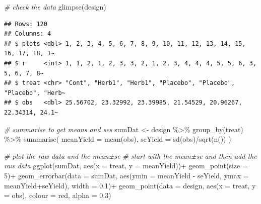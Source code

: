 \documentclass[
]{book}
\newenvironment{Shaded}{\begin{snugshade}}{\end{snugshade}}
\newcommand{\AttributeTok}[1]{\textcolor[rgb]{0.77,0.63,0.00}{#1}}
\newcommand{\CommentTok}[1]{\textcolor[rgb]{0.56,0.35,0.01}{\textit{#1}}}
\newcommand{\DecValTok}[1]{\textcolor[rgb]{0.00,0.00,0.81}{#1}}
\newcommand{\FloatTok}[1]{\textcolor[rgb]{0.00,0.00,0.81}{#1}}
\newcommand{\FunctionTok}[1]{\textcolor[rgb]{0.00,0.00,0.00}{#1}}
\newcommand{\NormalTok}[1]{#1}
\newcommand{\OtherTok}[1]{\textcolor[rgb]{0.56,0.35,0.01}{#1}}
\newcommand{\SpecialCharTok}[1]{\textcolor[rgb]{0.00,0.00,0.00}{#1}}
\newcommand{\StringTok}[1]{\textcolor[rgb]{0.31,0.60,0.02}{#1}}
\begin{document}
\begin{Shaded}
\begin{Highlighting}[]
\CommentTok{\# check the data}
\FunctionTok{glimpse}\NormalTok{(design)}
\end{Highlighting}
\end{Shaded}

\begin{verbatim}
## Rows: 120
## Columns: 4
## $ plots <dbl> 1, 2, 3, 4, 5, 6, 7, 8, 9, 10, 11, 12, 13, 14, 15, 16, 17, 18, 1~
## $ r     <int> 1, 1, 2, 1, 2, 3, 3, 2, 1, 2, 3, 4, 4, 4, 5, 5, 6, 3, 5, 6, 7, 8~
## $ treat <chr> "Cont", "Herb1", "Herb1", "Placebo", "Placebo", "Placebo", "Herb~
## $ obs   <dbl> 25.56702, 23.32992, 23.39985, 21.54529, 20.96267, 22.34314, 24.1~
\end{verbatim}

\begin{Shaded}
\begin{Highlighting}[]
\CommentTok{\# summarise to get means and ses}
\NormalTok{sumDat }\OtherTok{\textless{}{-}}\NormalTok{ design }\SpecialCharTok{\%\textgreater{}\%} 
  \FunctionTok{group\_by}\NormalTok{(treat) }\SpecialCharTok{\%\textgreater{}\%} 
  \FunctionTok{summarise}\NormalTok{(}
    \AttributeTok{meanYield =} \FunctionTok{mean}\NormalTok{(obs),}
    \AttributeTok{seYield =} \FunctionTok{sd}\NormalTok{(obs)}\SpecialCharTok{/}\FunctionTok{sqrt}\NormalTok{(}\FunctionTok{n}\NormalTok{())}
\NormalTok{  )}

\CommentTok{\# plot the raw data and the mean±se}
\CommentTok{\# start with the mean±se and then add the raw data}
\FunctionTok{ggplot}\NormalTok{(sumDat, }\FunctionTok{aes}\NormalTok{(}\AttributeTok{x =}\NormalTok{ treat, }\AttributeTok{y =}\NormalTok{ meanYield))}\SpecialCharTok{+}
  \FunctionTok{geom\_point}\NormalTok{(}\AttributeTok{size =} \DecValTok{5}\NormalTok{)}\SpecialCharTok{+}
  \FunctionTok{geom\_errorbar}\NormalTok{(}\AttributeTok{data =}\NormalTok{ sumDat, }\FunctionTok{aes}\NormalTok{(}\AttributeTok{ymin =}\NormalTok{ meanYield }\SpecialCharTok{{-}}\NormalTok{ seYield, }\AttributeTok{ymax =}\NormalTok{ meanYield}\SpecialCharTok{+}\NormalTok{seYield),}
                \AttributeTok{width =} \FloatTok{0.1}\NormalTok{)}\SpecialCharTok{+}
  \FunctionTok{geom\_point}\NormalTok{(}\AttributeTok{data =}\NormalTok{ design, }\FunctionTok{aes}\NormalTok{(}\AttributeTok{x =}\NormalTok{ treat, }\AttributeTok{y =}\NormalTok{ obs), }\AttributeTok{colour =} \StringTok{\textquotesingle{}red\textquotesingle{}}\NormalTok{, }\AttributeTok{alpha =} \FloatTok{0.3}\NormalTok{)}
\end{Highlighting}
\end{Shaded}
\end{document}
